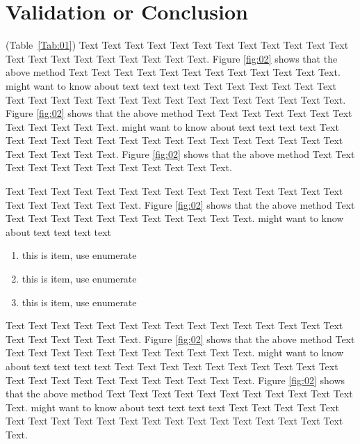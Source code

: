 \documentclass{bioinfo}
\begin{document}
%
%






\section{Validation or Conclusion}

(Table~\ref{Tab:01}) Text Text Text Text Text Text  Text Text Text Text Text Text Text Text Text  Text Text Text Text Text Text. Figure \ref{fig:02} shows that the above method  Text Text Text Text  Text Text Text Text Text Text  Text Text.  \citealp{Boffelli03} might want to know about  text text text text
Text Text Text Text Text Text  Text Text Text Text Text Text Text Text Text  Text Text Text Text Text Text. Figure \ref{fig:02} shows that the above method  Text Text Text Text  Text Text Text Text Text Text  Text Text.  \citealp{Boffelli03} might want to know about  text text text text
Text Text Text Text Text Text  Text Text Text Text Text Text Text Text Text  Text Text Text Text Text Text. Figure \ref{fig:02} shows that the above method  Text Text Text Text  Text Text Text Text Text Text  Text Text.



Text Text Text Text Text Text  Text Text Text Text Text Text Text Text Text  Text Text Text Text Text Text. Figure \ref{fig:02} shows that the above method  Text Text Text Text  Text Text Text Text Text Text  Text Text.  \citealp{Boffelli03} might want to know about  text text text text





\begin{enumerate}
\item this is item, use enumerate
\item this is item, use enumerate
\item this is item, use enumerate
\end{enumerate}

Text Text Text Text Text Text  Text Text Text Text Text Text Text Text Text  Text Text Text Text Text Text. Figure \ref{fig:02} shows that the above method  Text Text Text Text  Text Text Text Text Text Text  Text Text.  \citealp{Boffelli03} might want to know about  text text text text
Text Text Text Text Text Text  Text Text Text Text Text Text Text Text Text  Text Text Text Text Text Text. Figure \ref{fig:02} shows that the above method  Text Text Text Text  Text Text Text Text Text Text  Text Text.  \citealp{Boffelli03} might want to know about  text text text text
Text Text Text Text Text Text  Text Text Text Text Text Text Text Text Text  Text Text Text Text Text Text.
\end{document}
